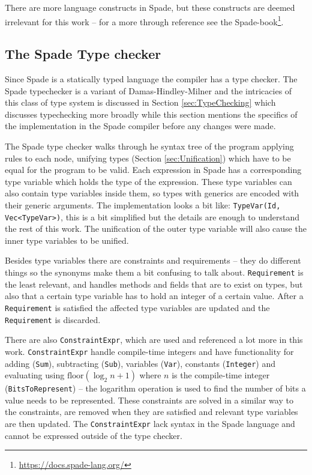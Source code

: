 There are more language constructs in Spade, but these constructs are deemed irrelevant for this work -- for a more through reference see the Spade-book\footnote{\url{https://docs.spade-lang.org/}}.

\subsection{The Spade Type checker}
\label{sec:TheSpadeType checker}
Since Spade is a statically typed language the compiler has a type checker. The Spade typechecker is a variant of Damas-Hindley-Milner and the intricacies of this class of type system is discussed in Section \ref{sec:TypeChecking} which discusses typechecking more broadly while this section mentions the specifics of the implementation in the Spade compiler before any changes were made.

The Spade type checker walks through he syntax tree of the program applying rules to each node, unifying types (Section \ref{sec:Unification}) which have to be equal for the program to be valid. Each expression in Spade has a corresponding type variable which holds the type of the expression. These type variables can also contain type variables inside them, so types with generics are encoded with their generic arguments. The implementation looks a bit like: \verb+TypeVar(Id, Vec<TypeVar>)+, this is a bit simplified but the details are enough to understand the rest of this work. The unification of the outer type variable will also cause the inner type variables to be unified.

Besides type variables there are constraints and requirements -- they do different things so the synonyms make them a bit confusing to talk about. \verb+Requirement+ is the least relevant, and handles methods and fields that are  to exist on types, but also that a certain type variable has to hold an integer of a certain value. After a \verb+Requirement+ is satisfied the affected type variables are updated and the \verb+Requirement+ is discarded.

There are also \verb+ConstraintExpr+, which are used and referenced a lot more in this work. \verb+ConstraintExpr+ handle compile-time integers and have functionality for adding (\verb+Sum+), subtracting (\verb+Sub+), variables (\verb+Var+), constants (\verb+Integer+) and evaluating using $\text{floor}(\log_2{n} + 1)$ where $n$ is the compile-time integer (\verb+BitsToRepresent+) -- the logarithm operation is used to find the number of bits a value needs to be represented. These constraints are solved in a similar way to the constraints, are removed when they are satisfied and relevant type variables are then updated. The \verb+ConstraintExpr+ lack syntax in the Spade language and cannot be expressed outside of the type checker.

